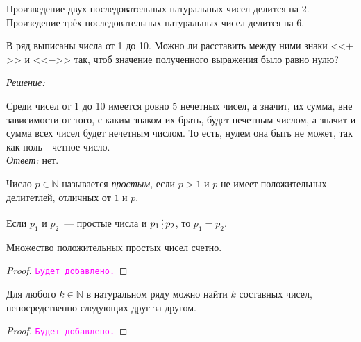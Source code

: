 \documentclass[11pt]{article}
\begin{document}
\begin{theorem}

	 Произведение двух последовательных натуральных чисел делится на 2. Произедение трёх последовательных натуральных чисел делится на 6.

\end{theorem}


\begin{example}

	В ряд выписаны числа от 1 до 10. Можно ли расставить между ними знаки <<$+$>> и <<$-$>> так, чтоб значение полученного выражения было равно нулю?

\end{example}

\textit{Решение:}

Среди чисел от 1 до 10 имеется ровно 5 нечетных чисел, а значит, их сумма, вне зависимости от того, с каким знаком их брать, будет нечетным числом, а значит и сумма всех чисел будет нечетным числом. То есть, нулем она быть не может, так как ноль - четное число.\\

\textit{Ответ:} нет.

\begin{definition}
    Число $p \in \mathbb{N}$ называется \emph{простым}, если $p > 1$ и $p$ не имеет положительных делитетлей, отличных от $1$ и $p$.
\end{definition}

\begin{statement}
	Если $p_1$ и $p_2$~--- простые числа и $p_1 \divisible p_2$, то $p_1 = p_2$.
\end{statement}

\begin{theorem}[Евклид]

    Множество положительных простых чисел счетно.

\end{theorem}

\begin{proof}
	\textcolor{magenta}{\texttt{Будет добавлено.}}
\end{proof}

\begin{theorem}
	Для любого $k \in \mathbb{N}$ в натуральном ряду можно найти $k$ составных чисел, непосредственно следующих друг за другом.
\end{theorem}
\begin{proof}
	\textcolor{magenta}{\texttt{Будет добавлено.}}
\end{proof}
\end{document}
